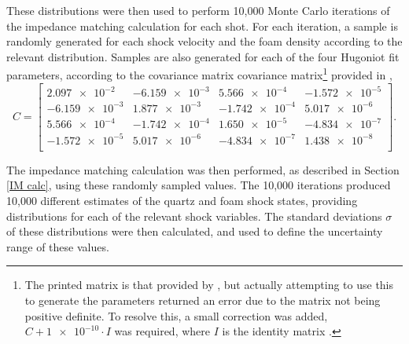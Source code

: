 These distributions were then used to perform 10,000 Monte Carlo iterations of the impedance matching calculation for each shot. For each iteration, a sample is randomly generated for each shock velocity and the foam density according to the relevant distribution. Samples are also generated for each of the four Hugoniot fit parameters, according to the covariance matrix covariance matrix\footnote{The printed matrix is that provided by \cite{Knudson2013}, but actually attempting to use this to generate the parameters returned an error due to the matrix not being positive definite. To resolve this, a small correction was added, $C + \num{1e-10}\cdot I$ was required, where $I$ is the identity matrix \cite{Holton2003}.}  provided in \cite{Knudson2013},
\[C = 
\begin{bmatrix}
\num{2.097e-2} & \num{-6.159e-3} & \num{5.566e-4} & \num{-1.572 e-5}\\
\num{-6.159e-3} & \num{1.877e-3} & \num{-1.742e-4} & \num{5.017e-6}\\
\num{5.566e-4} & \num{-1.742e-4} & \num{1.650e-5} & \num{-4.834e-7}\\
\num{-1.572 e-5} & \num{5.017e-6} & \num{-4.834e-7} & \num{1.438e-8}\\
\end{bmatrix}. 	
\]

The impedance matching calculation was then performed, as described in Section \ref{IM calc}, using these randomly sampled values. The 10,000 iterations produced 10,000 different estimates of the quartz and foam shock states, providing distributions for each of the relevant shock variables. The standard deviations $\sigma$ of these distributions were then calculated, and used to define the uncertainty range of these values.



